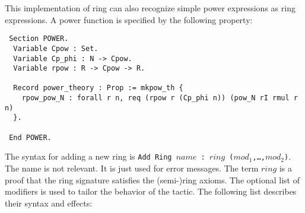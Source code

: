 This implementation of ring can also recognize simple 
power expressions as ring expressions. A power function is specified by 
the following property:
\begin{verbatim}
 Section POWER.
  Variable Cpow : Set.
  Variable Cp_phi : N -> Cpow.
  Variable rpow : R -> Cpow -> R. 
  
  Record power_theory : Prop := mkpow_th {
    rpow_pow_N : forall r n, req (rpow r (Cp_phi n)) (pow_N rI rmul r n)
  }.

 End POWER.
\end{verbatim}


The syntax for adding a new ring is {\tt Add Ring $name$ : $ring$
($mod_1$,\dots,$mod_2$)}.  The name is not relevant. It is just used
for error messages. The term $ring$ is a proof that the ring signature
satisfies the (semi-)ring axioms. The optional list of modifiers is
used to tailor the behavior of the tactic. The following list
describes their syntax and effects:
